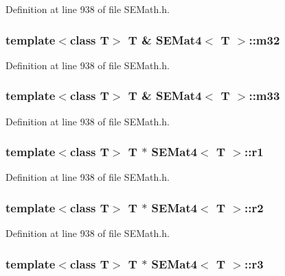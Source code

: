 Definition at line 938 of file S\+E\+Math.\+h.

\subsubsection[{m32}]{\setlength{\rightskip}{0pt plus 5cm}template$<$class T$>$ T \& {\bf S\+E\+Mat4}$<$ T $>$\+::m32}\label{class_s_e_mat4_aadbb0a3dc0b67d297fba0e374d65a363}


Definition at line 938 of file S\+E\+Math.\+h.

\subsubsection[{m33}]{\setlength{\rightskip}{0pt plus 5cm}template$<$class T$>$ T \& {\bf S\+E\+Mat4}$<$ T $>$\+::m33}\label{class_s_e_mat4_a639c1dd988a77b3c57e77769bd6365a1}


Definition at line 938 of file S\+E\+Math.\+h.

\subsubsection[{r1}]{\setlength{\rightskip}{0pt plus 5cm}template$<$class T$>$ T $\ast$ {\bf S\+E\+Mat4}$<$ T $>$\+::r1}\label{class_s_e_mat4_adf609cd5ace8672d4675392ce98ce644}


Definition at line 938 of file S\+E\+Math.\+h.

\subsubsection[{r2}]{\setlength{\rightskip}{0pt plus 5cm}template$<$class T$>$ T $\ast$ {\bf S\+E\+Mat4}$<$ T $>$\+::r2}\label{class_s_e_mat4_a332ae21d46488f5538f3d0f2db7646e4}


Definition at line 938 of file S\+E\+Math.\+h.

\subsubsection[{r3}]{\setlength{\rightskip}{0pt plus 5cm}template$<$class T$>$ T $\ast$ {\bf S\+E\+Mat4}$<$ T $>$\+::r3}\label{class_s_e_mat4_a8428e9eb6a84efbfef8bcdf74159f135}


